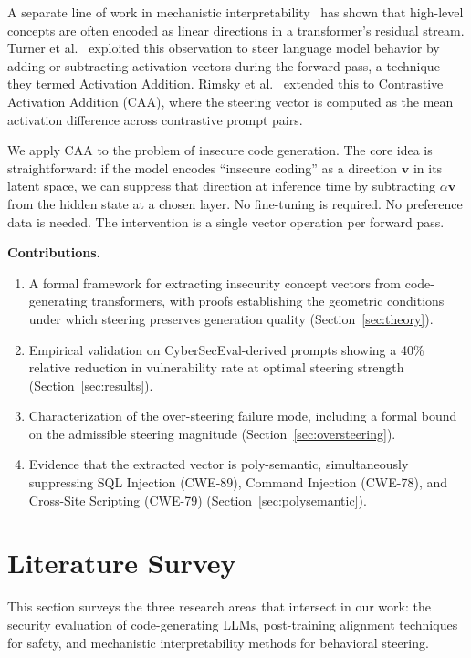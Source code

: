\documentclass[journal, onecolumn]{IEEEtran}
\begin{document}
A separate line of work in mechanistic interpretability~\cite{elhage2022, olah2020} has shown that high-level concepts are often encoded as linear directions in a transformer's residual stream. Turner et al.~\cite{turner2023} exploited this observation to steer language model behavior by adding or subtracting activation vectors during the forward pass, a technique they termed Activation Addition. Rimsky et al.~\cite{rimsky2024} extended this to Contrastive Activation Addition (CAA), where the steering vector is computed as the mean activation difference across contrastive prompt pairs.

We apply CAA to the problem of insecure code generation. The core idea is straightforward: if the model encodes ``insecure coding'' as a direction $\bm{v}$ in its latent space, we can suppress that direction at inference time by subtracting $\alpha \bm{v}$ from the hidden state at a chosen layer. No fine-tuning is required. No preference data is needed. The intervention is a single vector operation per forward pass.

\vspace{4pt}
\noindent\textbf{Contributions.}
\begin{enumerate}
    \item A formal framework for extracting insecurity concept vectors from code-generating transformers, with proofs establishing the geometric conditions under which steering preserves generation quality (Section~\ref{sec:theory}).
    \item Empirical validation on CyberSecEval-derived prompts showing a 40\% relative reduction in vulnerability rate at optimal steering strength (Section~\ref{sec:results}).
    \item Characterization of the over-steering failure mode, including a formal bound on the admissible steering magnitude (Section~\ref{sec:oversteering}).
    \item Evidence that the extracted vector is poly-semantic, simultaneously suppressing SQL Injection (CWE-89), Command Injection (CWE-78), and Cross-Site Scripting (CWE-79) (Section~\ref{sec:polysemantic}).
\end{enumerate}

\section{Literature Survey}
\label{sec:litsurvey}

This section surveys the three research areas that intersect in our work: the security evaluation of code-generating LLMs, post-training alignment techniques for safety, and mechanistic interpretability methods for behavioral steering.
\end{document}

